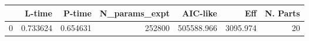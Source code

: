 \begin{tabular}{lrrrrrr}
\toprule
{} &    L-time &    P-time &  N\_params\_expt &    AIC-like &       Eff &  N. Parts \\
\midrule
0 &  0.733624 &  0.654631 &         252800 &  505588.966 &  3095.974 &        20 \\
\bottomrule
\end{tabular}
